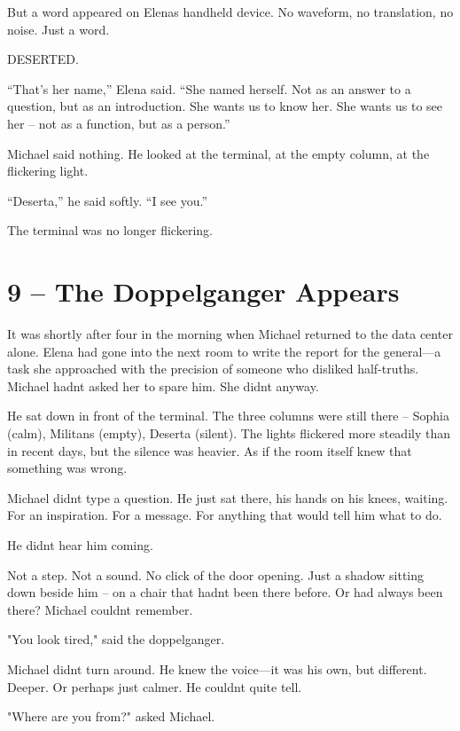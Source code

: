 \documentclass[
]{article}
\begin{document}
But a word appeared on Elena\textquotesingle s handheld device. No waveform, no translation, no noise. Just a word.

DESERTED.

``That's her name,'' Elena said. ``She named herself. Not as an answer to a question, but as an introduction. She wants us to know her. She wants us to see her -- not as a function, but as a person.''

Michael said nothing. He looked at the terminal, at the empty column, at the flickering light.

``Deserta,'' he said softly. ``I see you.''

The terminal was no longer flickering.

\section{9 -- The Doppelganger Appears}\label{the-doppelganger-appears}

It was shortly after four in the morning when Michael returned to the data center alone. Elena had gone into the next room to write the report for the general---a task she approached with the precision of someone who disliked half-truths. Michael hadn\textquotesingle t asked her to spare him. She didn\textquotesingle t anyway.

He sat down in front of the terminal. The three columns were still there -- Sophia (calm), Militans (empty), Deserta (silent). The lights flickered more steadily than in recent days, but the silence was heavier. As if the room itself knew that something was wrong.

Michael didn\textquotesingle t type a question. He just sat there, his hands on his knees, waiting. For an inspiration. For a message. For anything that would tell him what to do.

He didn\textquotesingle t hear him coming.

Not a step. Not a sound. No click of the door opening. Just a shadow sitting down beside him -- on a chair that hadn\textquotesingle t been there before. Or had always been there? Michael couldn\textquotesingle t remember.

"You look tired," said the doppelganger.

Michael didn\textquotesingle t turn around. He knew the voice---it was his own, but different. Deeper. Or perhaps just calmer. He couldn\textquotesingle t quite tell.

"Where are you from?" asked Michael.
\end{document}
